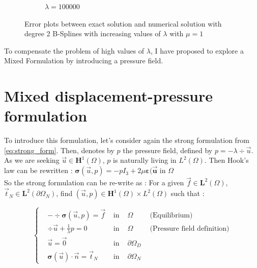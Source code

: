 \documentclass[a4paper,12pt,twoside]{report}
\begin{document}
\begin{figure}[!h]
\begin{subfigure}[b]{0.49\textwidth}
		\caption{$\lambda=100000$}
	\end{subfigure}
	\caption{Error plots between exact solution and numerical solution with degree 2 B-Splines with increasing values of $\lambda$ with $\mu = 1$}
	\label{fig:error_kappa}
\end{figure}


\newpage

To compensate the problem of high values of $\lambda$, I have proposed to explore a Mixed Formulation by introducing a pressure field.


\section{Mixed displacement-pressure formulation}
To introduce this formulation, let's consider again the strong formulation from \eqref{eq:strong_form}. Then, denotes by $p$ the pressure field, defined by $\displaystyle p = - \lambda \div{\vec u}$. As we are seeking $\vec u \in \boldsymbol{H}^1(\Omega)$, $p$ is naturally living in $L^2(\Omega)$. Then Hook's law can be rewritten : $\boldsymbol{\sigma} (\vec u,p) = -p I_3 + 2\mu \boldsymbol{\varepsilon(\vec u} \text{ in }  \Omega $ \\
So the strong formulation can be re-write as : For a given $\vec f \in \boldsymbol L^2(\Omega)$, $\vec t_N \in \boldsymbol L^2(\partial \Omega_N)$, find $(\vec u, p) \in \boldsymbol H^1(\Omega)\times L^2(\Omega)$ such that : 

\begin{equation}
	\label{eq:strong_pressure_disp_form}
	\left \{
	\begin{aligned}
		& - \div \boldsymbol{\sigma} (\vec u,p) = \vec f & \text{ in } & \Omega \hspace{1cm} \text{(Equilibrium)}\\
		& \div{\vec u} + \frac{1}{\lambda} p = 0 & \text{ in } & \Omega \hspace{1cm} \text{(Pressure field definition)} \\
		& \vec u = \vec 0 & \text{ in } &\partial \Omega_D \\
		& \boldsymbol{\sigma} (\vec u) \cdot \vec n = \vec t_N & \text{ in }& \partial \Omega_N
	\end{aligned}
	\right.
\end{equation}
\end{document}
